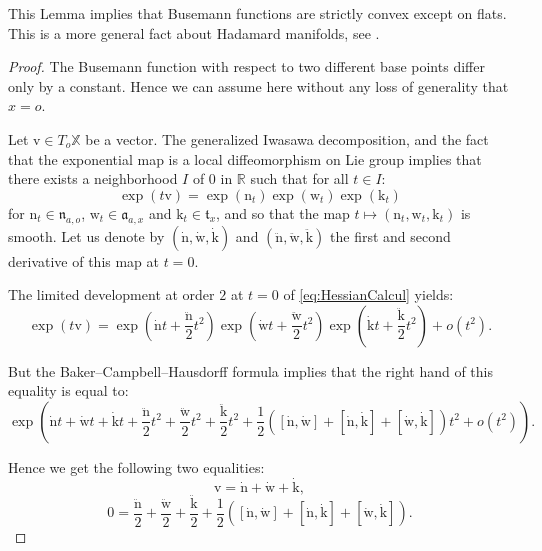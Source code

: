 \documentclass[reqno,10pt]{amsart}
\theoremstyle{plain}
\theoremstyle{definition}
\theoremstyle{remark}
\newcommand{\X}{\mathbb{X}}
\begin{document}
This Lemma implies that Busemann functions are strictly convex except on flats. This is a more general fact about Hadamard manifolds, see \cite{Eberlein}.

\medskip

\begin{proof}

The Busemann function with respect to two different base points differ only by a constant. Hence we can assume here without any loss of generality that $x=o$.

Let $\mathrm{v}\in T_o\X$ be a vector. The generalized Iwasawa decomposition, and the fact that the exponential map is a local diffeomorphism on Lie group implies that there exists a neighborhood $I$ of $0$ in $\mathbb{R}$ such that for all $t\in I$:
\begin{equation}
\label{eq:HessianCalcul}
\exp(t\mathrm{v})=\exp(\mathrm{n}_t)\exp(\mathrm{w}_t)\exp(\mathrm{k}_t)
 \end{equation}
 for $\mathrm{n}_t\in \mathfrak{n}_{a,o}$, $\mathrm{w}_t\in \mathfrak{a}_{a,x}$ and $\mathrm{k}_t\in \mathfrak{t}_{x}$, and so that the map $t\mapsto (\mathrm{n}_t,\mathrm{w}_t,\mathrm{k}_t)$ is smooth. Let us denote by $(\dot{\mathrm{n}},\dot{\mathrm{w}},\dot{\mathrm{k}})$ and $(\ddot{\mathrm{n}},\ddot{\mathrm{w}},\ddot{\mathrm{k}})$ the first and second derivative of this map at $t=0$.

\medskip

The limited development at order $2$ at $t=0$ of \eqref{eq:HessianCalcul} yields:
$$\exp(t\mathrm{v})=\exp\left(\dot{\mathrm{n}}t+\frac{\ddot{\mathrm{n}}}{2}t^2\right)\exp\left(\dot{\mathrm{w}}t+\frac{\ddot{\mathrm{w}}}{2}t^2\right)\exp\left(\dot{\mathrm{k}}t+\frac{\ddot{\mathrm{k}}}{2}t^2\right)+o(t^2).$$

 But the Baker–Campbell–Hausdorff formula \cite{Helgason} implies that the right hand of this equality is equal to:
 $$\exp\left(  \dot{\mathrm{n}}t+\dot{\mathrm{w}}t+\dot{\mathrm{k}}t+  \frac{\ddot{\mathrm{n}}}{2}t^2+\frac{\ddot{\mathrm{w}}}{2}t^2+\frac{\ddot{\mathrm{k}}}{2}t^2+\frac{1}{2}\left([\dot{\mathrm{n}},\dot{\mathrm{w}}]+[\dot{\mathrm{n}},\dot{\mathrm{k}}]+[\dot{\mathrm{w}},\dot{\mathrm{k}}]\right)t^2+o(t^2)\right).$$
 
 Hence we get the following two equalities:
$$\mathrm{v}=\dot{\mathrm{n}}+\dot{\mathrm{w}}+\dot{\mathrm{k}},$$
$$0=\frac{\ddot{\mathrm{n}}}{2}+\frac{\ddot{\mathrm{w}}}{2}+\frac{\ddot{\mathrm{k}}}{2}+\frac{1}{2}\left([\dot{\mathrm{n}},\dot{\mathrm{w}}]+[\dot{\mathrm{n}},\dot{\mathrm{k}}]+[\dot{\mathrm{w}},\dot{\mathrm{k}}]\right).$$



\end{proof}
\end{document}
